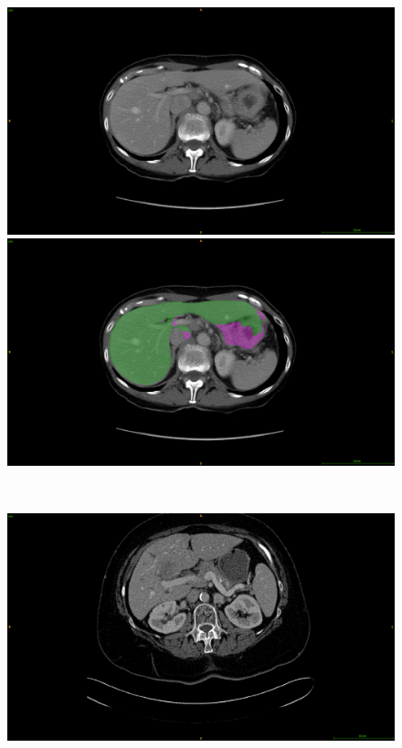 \begin{figure}[ht!]
	\begin{mdframed}[backgroundcolor=blue!50,linecolor=blue!50]
		\centering
		\begin{minipage}{0.45\linewidth}
			\includegraphics[width=\linewidth]{images/MisSegmentations/TCGA-BC-A3KF_slice61_raw}
		\end{minipage} \hspace{-0.1cm}
		\begin{minipage}{0.45\linewidth}
			\includegraphics[width=\linewidth]{images/MisSegmentations/TCGA-BC-A3KF_slice61_liverPrediction_Cmap}
		\end{minipage} \\
		\begin{minipage}{0.45\linewidth}
			\includegraphics[width=\linewidth]{images/MisSegmentations/TCGA-BC-A10Z_slice30_raw}

\end{minipage}
\end{mdframed}
\end{figure}
